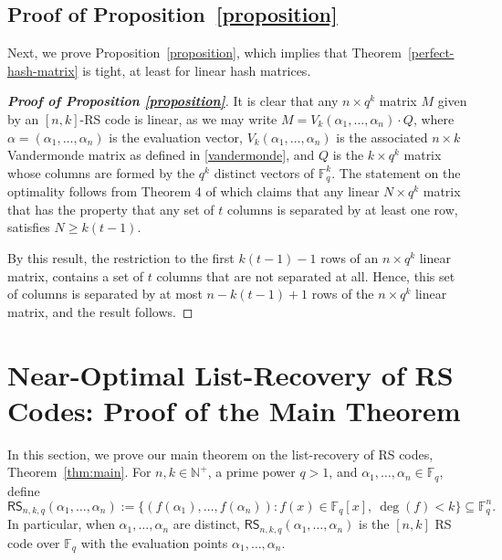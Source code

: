 \documentclass[11pt]{article}
\begin{document}
\subsection{Proof of Proposition~\ref{proposition}}
Next, we prove Proposition~\ref{proposition}, which implies that Theorem~\ref{perfect-hash-matrix} is tight, at least for linear hash matrices.
\begin{proof}[\textbf{Proof of Proposition \ref{proposition}}]
It is clear that any $n\times q^k$ matrix $M$ given by an $[n,k]$-RS code is linear, as we may write $M=V_k(\alpha_1,\ldots,\alpha_n)\cdot Q$, where $\alpha=(\alpha_1,\ldots,\alpha_n)$ is the evaluation vector,  $V_k(\alpha_1,\ldots,\alpha_n)$ is the associated $n\times k$ Vandermonde matrix as defined in \eqref{vandermonde}, and $Q$ is the $k\times q^k$ matrix whose columns are formed by the $q^k$ distinct vectors of $\mathbb{F}_q^k$.
The statement on the optimality follows  from  Theorem 4 of \cite{Blackburn1998Optimal} which claims that  any linear $N\times q^k$ matrix that has the property that any set of $t$ columns is separated by at least one row, satisfies $N\ge k(t-1)$.

By this result, the restriction to the first   $k(t-1)-1$ rows of an $n\times q^k$ linear matrix, contains a set of $t$ columns that are not separated at all. Hence, this set of columns is separated by at most $n-k(t-1)+1$ rows of the $n\times q^k$ linear matrix, and the result follows.
\end{proof}






















\section{Near-Optimal List-Recovery of RS Codes: Proof of the Main Theorem}
\label{list-recovery}

In this section, we prove our main theorem on the list-recovery of RS codes, Theorem~\ref{thm:main}.
For $n,k\in\mathbb{N}^+$, a prime power $q>1$, and $\alpha_1,\dots,\alpha_n\in\mathbb{F}_q$, define
\[
\mathsf{RS}_{n,k,q}(\alpha_1,\dots,\alpha_n):=\{(f(\alpha_1),\dots,f(\alpha_n)) : f(x)\in \mathbb{F}_q[x], ~\deg(f)<k\}\subseteq\mathbb{F}_q^n.
\]
In particular, when $\alpha_1,\dots,\alpha_n$ are distinct, $\mathsf{RS}_{n,k,q}(\alpha_1,\dots,\alpha_n)$ is the $[n,k]$ RS code over $\mathbb{F}_q$ with the evaluation points $\alpha_1,\dots,\alpha_n$.
\end{document}
